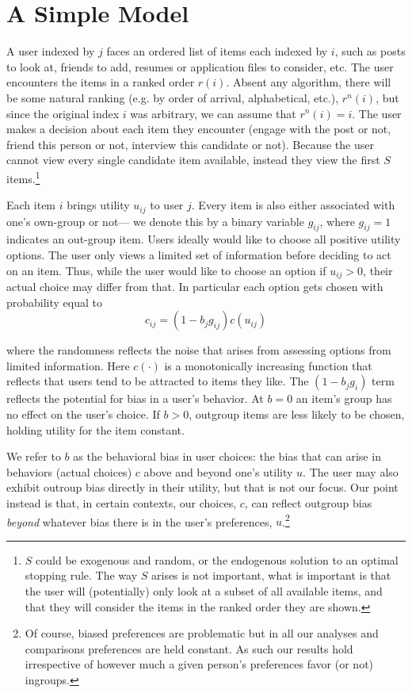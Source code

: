 \documentclass[12pt,letterpaper]{article}
\begin{document}
\section{A Simple Model}


A user indexed by $j$ faces an ordered list of items each indexed by $i$, such as posts to look at, friends to add, resumes or application files to consider, etc. The user encounters the items in a ranked order $r(i)$. Absent any algorithm, there will be some natural ranking (e.g. by order of arrival, alphabetical, etc.), $r^n(i)$, but since the original index $i$ was arbitrary, we can assume that $r^n(i) = i$. The user makes a decision about each item they encounter (engage with the post or not, friend this person or not, interview this candidate or not). Because the user cannot view every single candidate item available, instead they view the first $S$ items.\footnote{$S$ could be exogenous and random, or the endogenous solution to an optimal stopping rule. The way $S$ arises is not important, what is important is that the user will (potentially) only look at a subset of all available items, and that they will consider the items in the ranked order they are shown.}



Each item $i$ brings utility $u_{ij}$ to user $j$. Every item is also either associated with one's own-group or not--- we denote this by a binary variable $g_{ij}$, where $g_{ij}=1$ indicates an out-group item. Users ideally would like to choose all positive utility options. The user only views a limited set of information before deciding to act on an item. Thus, while the user would like to choose an option if $u_{ij} >0$, their actual choice may differ from that. In particular each option gets chosen with probability equal to 
$$c_{ij} = (1-b_jg_{ij})c(u_{ij})$$


where the randomness reflects the noise that arises from assessing options from limited information. Here $c(\cdot)$ is a monotonically increasing function that reflects that users tend to be attracted to items they like. The $(1-b_jg_{i})$ term reflects the potential for bias in a user's behavior. At $b=0$ an item's group has no effect on the user's choice. If $b >0$, outgroup items are less likely to be chosen, holding utility for the item constant. 

We refer to $b$ as the behavioral bias in user choices: the bias that can arise in behaviors (actual choices) $c$ above and beyond one's utility $u$. The user may also exhibit outroup bias directly in their utility, but that is not our focus. Our point instead is that, in certain contexts, our choices, $c$, can reflect outgroup bias \emph{beyond} whatever bias there is in the user's preferences, $u$.\footnote{Of course, biased preferences are problematic but in all our analyses and comparisons preferences are held constant. As such our results hold irrespective of however much a given person's preferences favor (or not) ingroups.} 
\end{document}
